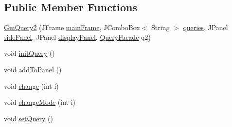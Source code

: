 \subsection*{Public Member Functions}
\begin{DoxyCompactItemize}
\item 
\hyperlink{classGuiQuery2_abf935498d661bd8a8ec951d3238527d7}{Gui\+Query2} (J\+Frame \hyperlink{classGUIQuery_aba988b5bec899d53480a472de7b87dfa}{main\+Frame}, J\+Combo\+Box$<$ String $>$ \hyperlink{classGUIQuery_a0db8bd960b4512cadf9aa40642934680}{queries}, J\+Panel \hyperlink{classGUIQuery_a70e233b1f14874166b7707edebe825d2}{side\+Panel}, J\+Panel \hyperlink{classGUIQuery_a8b4dbf257e0859c597591f072349b75c}{display\+Panel}, \hyperlink{classQueryFacade}{Query\+Facade} q2)
\item 
void \hyperlink{classGuiQuery2_adb51f7db961816ce8f31043affeee2e7}{init\+Query} ()
\item 
void \hyperlink{classGuiQuery2_ad41b33535518a909e7ed9bcd7be271a4}{add\+To\+Panel} ()
\item 
void \hyperlink{classGuiQuery2_a8d5d3771f27c0c86d8af1d8b361218ec}{change} (int i)
\item 
void \hyperlink{classGuiQuery2_a90d0eb0359bc36e9bddcfa6b3308bb85}{change\+Mode} (int i)
\item 
void \hyperlink{classGuiQuery2_af4f531c30a9b1aff5fd0474741611df3}{set\+Query} ()
\end{DoxyCompactItemize}
